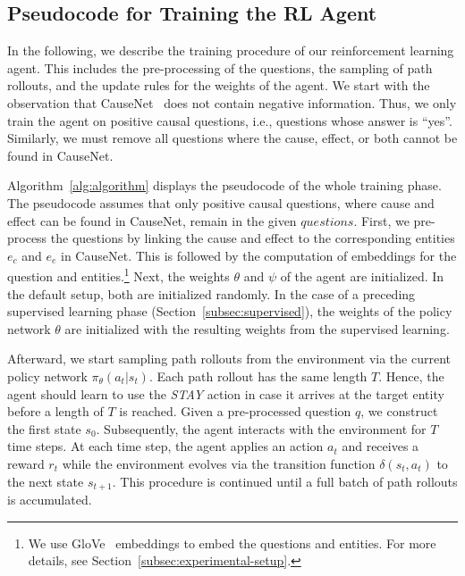 


\subsection{Pseudocode for Training the RL Agent}
\label{sec:pseudocode-training}

In the following, we describe the training procedure of our reinforcement learning agent. This includes the pre-processing of the questions, the sampling of path rollouts, and the update rules for the weights of the agent. We start with the observation that CauseNet~\cite{Heindorf2020Causenet} does not contain negative information. Thus, we only train the agent on positive causal questions, i.e., questions whose answer is ``yes''. Similarly, we must remove all questions where the cause, effect, or both cannot be found in CauseNet.

Algorithm~\ref{alg:algorithm} displays the pseudocode of the whole training phase. The pseudocode assumes that only positive causal questions, where cause and effect can be found in CauseNet, remain in the given $questions$. First, we pre-process the questions by linking the cause and effect to the corresponding entities $e_c$ and $e_e$ in CauseNet. This is followed by the computation of embeddings for the question and entities.\footnote{We use GloVe~\cite{Pennington2014Glove} embeddings to embed the questions and entities. For more details, see Section~\ref{subsec:experimental-setup}.} Next, the weights $\theta$ and $\psi$ of the agent are initialized. In the default setup, both are initialized randomly. In the case of a preceding supervised learning phase (Section~\ref{subsec:supervised}), the weights of the policy network $\theta$ are initialized with the resulting weights from the supervised learning.



Afterward, we start sampling path rollouts from the environment via the current policy network $\pi_\theta(a_t | s_t)$. Each path rollout has the same length $T$. Hence, the agent should learn to use the \textit{STAY} action in case it arrives at the target entity before a length of $T$ is reached. Given a pre-processed question $q$, we construct the first state $s_0$. Subsequently, the agent interacts with the environment for $T$ time steps. At each time step, the agent applies an action $a_t$ and receives a reward $r_t$ while the environment evolves via the transition function $\delta(s_t, a_t)$ to the next state $s_{t+1}$. This procedure is continued until a full batch of path rollouts is accumulated.

